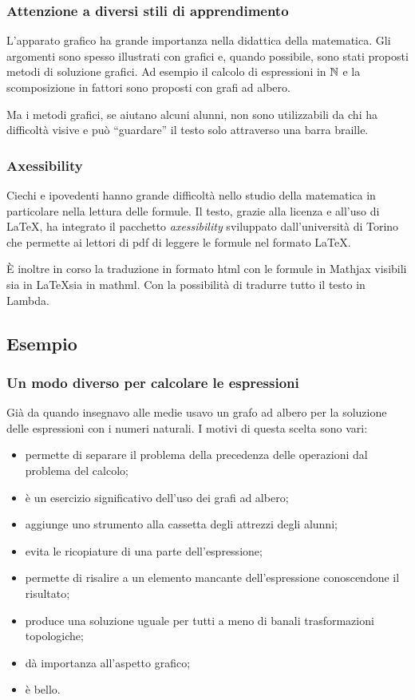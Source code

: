 \documentclass{beamer} %
\begin{document}
\begin{frame}\frametitle{Attenzione a diversi stili di apprendimento}

L'apparato grafico ha grande importanza nella didattica della matematica.
\spause
Gli argomenti sono spesso illustrati con grafici e, quando possibile, sono 
stati proposti metodi di soluzione grafici.
\spause
Ad esempio il calcolo di espressioni in \(\mathbb{N}\) e la scomposizione in fattori 
sono proposti con grafi ad albero.

Ma i metodi grafici, se aiutano alcuni alunni, non sono utilizzabili da chi 
ha difficoltà visive e può ``guardare'' il testo solo attraverso una 
barra braille.

\end{frame}


\begin{frame}\frametitle{Axessibility}

Ciechi e ipovedenti hanno grande difficoltà nello studio della matematica 
in particolare nella lettura delle formule.
Il testo, grazie alla licenza e all'uso di \LaTeX, ha integrato il pacchetto 
\emph{axessibility} sviluppato dall'università di Torino che permette ai 
lettori di pdf di leggere le formule nel formato \LaTeX.

È inoltre in corso la traduzione in formato html con le formule in Mathjax 
visibili sia in \LaTeX sia in mathml. Con la possibilità di tradurre tutto il 
testo in Lambda.

\end{frame}


\subsection{Esempio} 


\begin{frame}\frametitle{Un modo diverso per calcolare le espressioni}

Già da quando insegnavo alle medie usavo un grafo ad 
albero per la soluzione delle espressioni con i numeri naturali. 
I motivi di questa scelta sono vari:

\begin{itemize} %
\item permette di separare il problema della precedenza delle operazioni dal 
problema del calcolo;
\item è un esercizio significativo dell'uso dei grafi ad albero;
\item aggiunge uno strumento alla cassetta degli attrezzi degli alunni;
\item evita le ricopiature di una parte dell'espressione;
\item permette di risalire a un elemento mancante dell'espressione 
conoscendone il risultato;
\item produce una soluzione uguale per tutti a meno di banali 
trasformazioni topologiche;
\item dà importanza all'aspetto grafico;
\item è bello.
\end{itemize}

\end{frame}
\end{document}
